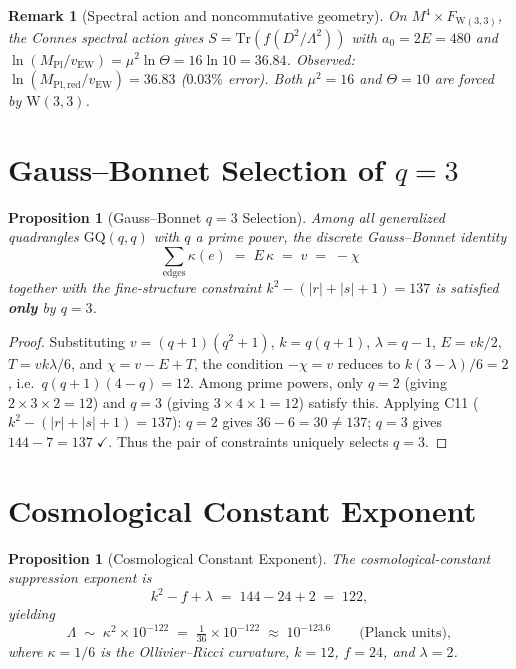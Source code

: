 \documentclass[12pt,a4paper]{article}
\newtheorem{proposition}[theorem]{Proposition}
\newtheorem{remark}[theorem]{Remark}
\newcommand{\W}{\mathrm{W}(3,3)}
\begin{document}
\begin{remark}[Spectral action and noncommutative geometry]
On $M^4\times F_{\W}$, the Connes spectral action gives
$S = \mathrm{Tr}(f(D^2/\Lambda^2))$ with $a_0=2E=480$ and
$\ln(M_{\mathrm{Pl}}/v_{\mathrm{EW}}) = \mu^2\ln\Theta = 16\ln 10 = 36.84$.
Observed: $\ln(M_{\mathrm{Pl,red}}/v_{\mathrm{EW}}) = 36.83$ ($0.03\%$ error).
Both $\mu^2=16$ and $\Theta=10$ are forced by $\W$.
\end{remark}

\section{Gauss--Bonnet Selection of $q = 3$}
\label{sec:gb-selection}

\begin{proposition}[Gauss--Bonnet $q = 3$ Selection]\label{prop:gb-selection}
Among all generalized quadrangles $\mathrm{GQ}(q,q)$ with $q$ a prime
power, the discrete Gauss--Bonnet identity
\[
  \sum_{\text{edges}} \kappa(e) \;=\; E\,\kappa
  \;=\; v \;=\; -\chi
\]
together with the fine-structure constraint
$k^2 - (|r|{+}|s|{+}1) = 137$ is satisfied \textbf{only} by $q = 3$.
\end{proposition}

\begin{proof}
Substituting $v = (q{+}1)(q^2{+}1)$, $k = q(q{+}1)$,
$\lambda = q{-}1$, $E = vk/2$, $T = vk\lambda/6$, and
$\chi = v - E + T$, the condition $-\chi = v$
reduces to $k(3{-}\lambda)/6 = 2$, i.e.\
$q(q{+}1)(4{-}q) = 12$.
Among prime powers, only $q = 2$ (giving $2 \times 3 \times 2 = 12$)
and $q = 3$ (giving $3 \times 4 \times 1 = 12$) satisfy this.
Applying C11 ($k^2 - (|r|{+}|s|{+}1) = 137$):
$q = 2$ gives $36 - 6 = 30 \neq 137$;
$q = 3$ gives $144 - 7 = 137\;\checkmark$.
Thus the pair of constraints uniquely selects $q = 3$.
\end{proof}

\section{Cosmological Constant Exponent}
\label{sec:lambda-cc}

\begin{proposition}[Cosmological Constant Exponent]\label{prop:lambda-cc}
The cosmological-constant suppression exponent is
\[
  k^2 - f + \lambda
  \;=\; 144 - 24 + 2
  \;=\; 122,
\]
yielding
\[
  \Lambda \;\sim\; \kappa^2 \times 10^{-122}
  \;=\; \tfrac{1}{36}\times 10^{-122}
  \;\approx\; 10^{-123.6}
  \qquad\text{(Planck units)},
\]
where $\kappa = 1/6$ is the Ollivier--Ricci curvature, $k = 12$,
$f = 24$, and $\lambda = 2$.
\end{proposition}
\end{document}
